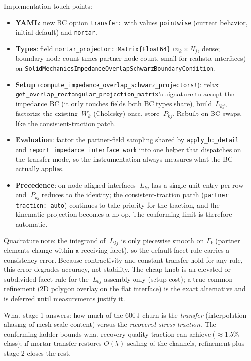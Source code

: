 \documentclass[11pt]{article}
\begin{document}
Implementation touch points:
\begin{itemize}
\item \textbf{YAML}: new BC option \texttt{transfer:} with values
      \texttt{pointwise} (current behavior, initial default) and
      \texttt{mortar}.
\item \textbf{Types}: field \texttt{mortar\_projector::Matrix\{Float64\}}
      ($n_k \times N_j$, dense; boundary node count times partner node
      count, small for realistic interfaces) on
      \texttt{SolidMechanicsImpedanceOverlapSchwarzBoundaryCondition}.
\item \textbf{Setup} (\texttt{compute\_impedance\_overlap\_schwarz\_projectors!}):
      relax \texttt{get\_overlap\_rectangular\_projection\_matrix}'s
      signature to accept the impedance BC (it only touches fields both
      BC types share), build $~L_{kj}$, factorize the existing
      $~W_k$ (Cholesky) once, store $~P_{kj}$.  Rebuilt on BC swaps,
      like the consistent-traction patch.
\item \textbf{Evaluation}: factor the partner-field sampling shared by
      \texttt{apply\_bc\_detail} and
      \texttt{report\_impedance\_interface\_work} into one helper that
      dispatches on the transfer mode, so the instrumentation always
      measures what the BC actually applies.
\item \textbf{Precedence}: on node-aligned interfaces $~L_{kj}$ has a
      single unit entry per row and $~P_{kj}$ reduces to the identity;
      the consistent-traction patch (\texttt{partner traction: auto})
      continues to take priority for the traction, and the kinematic
      projection becomes a no-op.  The conforming limit is therefore
      automatic.
\end{itemize}

Quadrature note: the integrand of $~L_{kj}$ is only piecewise smooth
on $\Gamma_k$ (partner elements change within a receiving facet), so
the default facet rule carries a consistency error.  Because
contractivity and constant-transfer hold for any rule, this error
degrades accuracy, not stability.  The cheap knob is an elevated or
subdivided facet rule for the $~L_{kj}$ assembly only (setup cost);
a true common-refinement (2D polygon overlay on the flat interface)
is the exact alternative and is deferred until measurements justify
it.

What stage 1 answers: how much of the 600\,J churn is the
\emph{transfer} (interpolation aliasing of mesh-scale content) versus
the \emph{recovered-stress traction}.  The conforming ladder bounds
what recovery-quality traction can achieve ($\approx$1.5\%-class); if
mortar transfer restores $O(h)$ scaling of the channels, refinement
plus stage 2 closes the rest.
\end{document}
